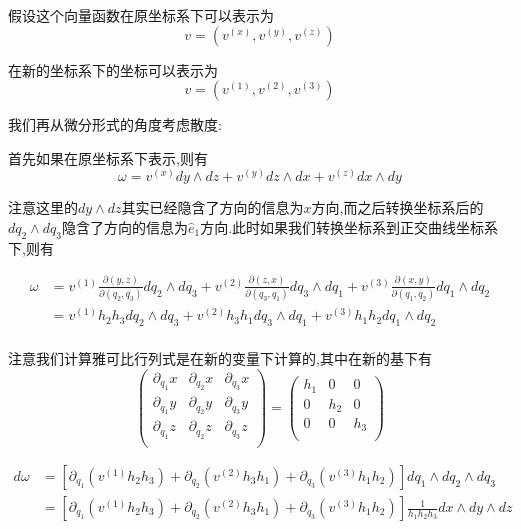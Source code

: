 \documentclass[11pt,hyperref,a4paper,UTF8]{ctexart}
\newcommand{\parameter}[1]{\left(#1\right)}
\newcommand{\bracket}[1]{\left[#1\right]}
\begin{document}
\begin{CJK}{UTF8}{gkai}
假设这个向量函数在原坐标系下可以表示为
\[v = (v^{(x)},v^{(y)},v^{(z)})\]

在新的坐标系下的坐标可以表示为
\[v = (v^{(1)},v^{(2)},v^{(3)})\]



我们再从微分形式的角度考虑散度:

首先如果在原坐标系下表示,则有
\[\omega = v^{(x)} dy \wedge dz + v^{(y)} dz \wedge dx + v^{(z)}dx \wedge dy\]

注意这里的$dy \wedge dz$其实已经隐含了方向的信息为$x$方向,而之后转换坐标系后的$dq_2 \wedge dq_3$隐含了方向的信息为$\hat{e}_1$方向.此时如果我们转换坐标系到正交曲线坐标系下,则有

\[
\begin{aligned}
  \omega &= v^{(1)} \frac{\partial(y,z)}{\partial (q_2,q_3)} dq_2 \wedge dq_3 + v^{(2)} \frac{\partial (z,x)}{\partial (q_3,q_1)}dq_3 \wedge dq_1 + v^{(3)} \frac{\partial (x,y)}{\partial(q_1,q_2)}dq_1 \wedge dq_2\\
  &= v^{(1)} h_2 h_3 dq_2 \wedge dq_3 + v^{(2)} h_3 h_1 dq_3 \wedge dq_1 + v^{(3)} h_1 h_2 dq_1 \wedge dq_2\\
\end{aligned}
\]

注意我们计算雅可比行列式是在新的变量下计算的,其中在新的基下有
\[\begin{pmatrix}
  \partial_{q_1} x & \partial_{q_2} x & \partial_{q_3} x\\ 
  \partial_{q_1} y & \partial_{q_2} y & \partial_{q_3} y\\ 
  \partial_{q_1} z & \partial_{q_2} z & \partial_{q_3} z\\ 
\end{pmatrix} = \begin{pmatrix}
  h_1 & 0 & 0\\
  0 & h_2 & 0\\
  0 & 0 & h_3\\
\end{pmatrix}\]

\[
\begin{aligned}
  d\omega &= \bracket{\partial_{q_1}(v^{(1)} h_2 h_3) + \partial_{q_2}(v^{(2)} h_3 h_1) + \partial_{q_3}(v^{(3)} h_1 h_2)} dq_1 \wedge dq_2 \wedge dq_3\\
  &= \bracket{\partial_{q_1}(v^{(1)} h_2 h_3) + \partial_{q_2}(v^{(2)} h_3 h_1) + \partial_{q_3}(v^{(3)} h_1 h_2)} \frac{1}{h_1 h_2 h_3} dx \wedge dy \wedge dz\\
\end{aligned}
\]


\end{CJK}
\end{document}
